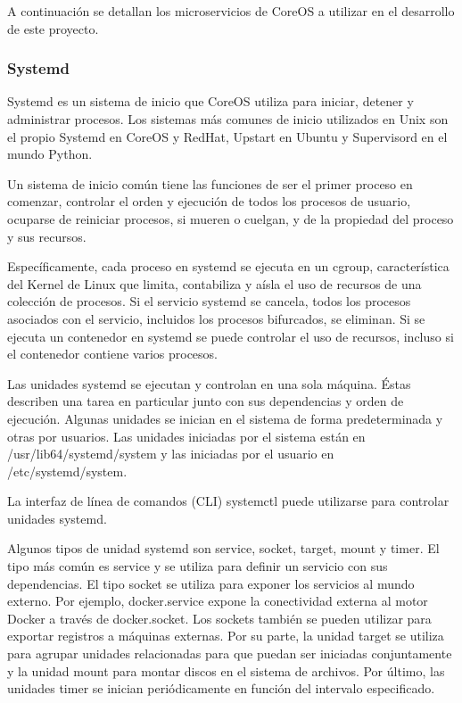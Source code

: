 A continuación se detallan los microservicios de CoreOS a utilizar en el desarrollo de este proyecto.

\subsubsection{Systemd}

Systemd es un sistema de inicio que CoreOS utiliza para iniciar, detener y administrar procesos. Los sistemas más comunes de inicio utilizados en Unix son el propio Systemd en CoreOS y RedHat, Upstart en Ubuntu y Supervisord en el mundo Python.

Un sistema de inicio común tiene las funciones de ser el primer proceso en comenzar, controlar el orden y ejecución de todos los procesos de usuario, ocuparse de reiniciar procesos, si mueren o cuelgan, y de la propiedad del proceso y sus recursos.

Específicamente, cada proceso en systemd se ejecuta en un cgroup, característica del Kernel de Linux que limita, contabiliza y aísla el uso de recursos de una colección de procesos. Si el servicio systemd se cancela, todos los procesos asociados con el servicio, incluidos los procesos bifurcados, se eliminan. Si se ejecuta un contenedor en systemd se puede controlar el uso de recursos, incluso si el contenedor contiene varios procesos.
 
Las unidades systemd se ejecutan y controlan en una sola máquina. Éstas describen una tarea en particular junto con sus dependencias y orden de ejecución. Algunas unidades se inician en el sistema de forma predeterminada y otras por usuarios. Las unidades iniciadas por el sistema están en /usr/lib64/systemd/system y las iniciadas por el usuario en /etc/systemd/system.

La interfaz de línea de comandos (CLI) systemctl puede utilizarse para controlar unidades systemd.

Algunos tipos de unidad systemd son service, socket, target, mount y timer. El tipo más común es service y se utiliza para definir un servicio con sus dependencias. El tipo socket se utiliza para exponer los servicios al mundo externo. Por ejemplo, docker.service expone la conectividad externa al motor Docker a través de docker.socket. Los sockets también se pueden utilizar para exportar registros a máquinas externas. Por su parte, la unidad target se utiliza para agrupar unidades relacionadas para que puedan ser iniciadas conjuntamente y la unidad mount para montar discos en el sistema de archivos. Por último, las unidades timer se inician periódicamente en función del intervalo especificado.

